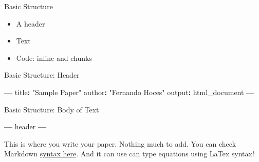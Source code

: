 \documentclass[ignorenonframetext,]{beamer}
\newenvironment{Shaded}{\begin{snugshade}}{\end{snugshade}}
\newcommand{\NormalTok}[1]{#1}
\newcommand{\OperatorTok}[1]{\textcolor[rgb]{0.81,0.36,0.00}{\textbf{#1}}}
\newcommand{\StringTok}[1]{\textcolor[rgb]{0.31,0.60,0.02}{#1}}
\providecommand{\tightlist}{%
  \setlength{\itemsep}{0pt}\setlength{\parskip}{0pt}}
\begin{document}
\begin{frame}{Basic Structure}
\protect\hypertarget{basic-structure}{}

\begin{itemize}
\tightlist
\item
  A header
\item
  Text
\item
  Code: inline and chunks
\end{itemize}

\end{frame}

\begin{frame}[fragile]{Basic Structure: Header}
\protect\hypertarget{basic-structure-header}{}

\begin{Shaded}
\begin{Highlighting}[]
\OperatorTok{---}
\NormalTok{title}\OperatorTok{:}\StringTok{ "Sample Paper"}
\NormalTok{author}\OperatorTok{:}\StringTok{ "Fernando Hoces"}
\NormalTok{output}\OperatorTok{:}\StringTok{ }\NormalTok{html_document}
\OperatorTok{---}
\end{Highlighting}
\end{Shaded}

\end{frame}

\begin{frame}[fragile]{Basic Structure: Body of Text}
\protect\hypertarget{basic-structure-body-of-text}{}

\begin{Shaded}
\begin{Highlighting}[]
\OperatorTok{---}
\NormalTok{header}
\OperatorTok{---}
\end{Highlighting}
\end{Shaded}

This is where you write your paper. Nothing much to add. You can check
Markdown
\href{https://www.rstudio.com/wp-content/uploads/2015/02/rmarkdown-cheatsheet.pdf}{syntax
here}. And it can use can type equations using LaTex syntax!

\end{frame}
\end{document}
